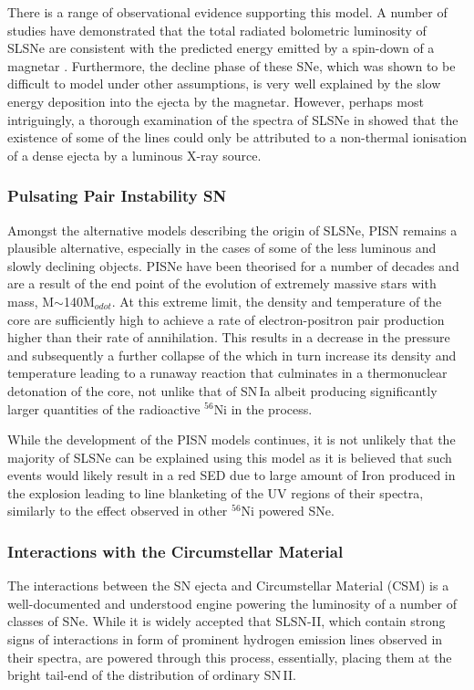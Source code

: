 There is a range of observational evidence supporting this model. A number of studies have demonstrated that the total radiated bolometric luminosity of SLSNe are consistent with the predicted energy emitted by a spin-down of a magnetar \citep{Inserra2013}. Furthermore, the decline phase of these SNe, which was shown to be difficult to model under other assumptions, is very well explained by the slow energy deposition into the ejecta by the magnetar. However, perhaps most intriguingly, a thorough examination of the spectra of SLSNe in \citet{Mazzali2015} showed that the existence of some of the lines could only be attributed to a non-thermal ionisation of a dense ejecta by a luminous X-ray source.

\subsubsection{Pulsating Pair Instability SN}
Amongst the alternative models describing the origin of SLSNe, PISN remains a plausible alternative, especially in the cases of some of the less luminous and slowly declining objects. PISNe have been theorised for a number of decades \citep{Fraley1968} and are a result of the end point of the evolution of extremely massive stars with mass, M$\sim$140M$_{odot}$. At this extreme limit, the density and temperature of the core are sufficiently high to achieve a rate of electron-positron pair production higher than their rate of annihilation. This results in a decrease in the pressure and subsequently a further collapse of the which in turn increase its density and temperature leading to a runaway reaction that culminates in a thermonuclear detonation of the core, not unlike that of SN\,Ia albeit producing significantly larger quantities of the radioactive $^{56}$Ni in the process.

While the development of the PISN models continues, it is not unlikely that the majority of SLSNe can be explained using this model as it is believed \citep{Jerkstrand2016} that such events would likely result in a red SED due to large amount of Iron produced in the explosion leading to line blanketing of the UV regions of their spectra, similarly to the effect observed in other $^{56}$Ni powered SNe.

\subsubsection{Interactions with the Circumstellar Material}
The interactions between the SN ejecta and Circumstellar Material (CSM) is a well-documented and understood engine powering the luminosity of a number of classes of SNe. While it is widely accepted that SLSN-II, which contain strong signs of interactions in form of prominent hydrogen emission lines observed in their spectra, are powered through this process, essentially, placing them at the bright tail-end of the distribution of ordinary SN\,II.

